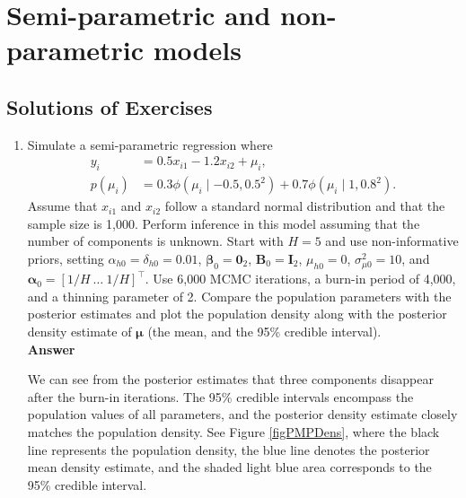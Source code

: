 \chapter{Semi-parametric and non-parametric models}\label{chap11}

\section*{Solutions of Exercises}\label{sec11_1}
\begin{enumerate}[leftmargin=*]

\item Simulate a semi-parametric regression where  
\begin{align*}
	y_i &= 0.5x_{i1} - 1.2x_{i2} + \mu_i, \\
	p(\mu_i) &= 
	0.3 \phi(\mu_i \mid -0.5,0.5^2) + 0.7 \phi(\mu_i \mid 1,0.8^2).		
\end{align*}
Assume that $x_{i1}$ and $x_{i2}$ follow a standard normal distribution and that the sample size is 1,000. Perform inference in this model assuming that the number of components is unknown. Start with $H=5$ and use non-informative priors, setting $\alpha_{h0}=\delta_{h0}=0.01$, $\bm{\beta}_0=\bm{0}_2$, $\bm{B}_0=\bm{I}_2$, $\mu_{h0}=0$, $\sigma^2_{\mu 0}=10$, and $\bm{\alpha}_0=[1/H \ \dots \ 1/H]^{\top}$. Use 6,000 MCMC iterations, a burn-in period of 4,000, and a thinning parameter of 2. Compare the population parameters with the posterior estimates and plot the population density along with the posterior density estimate of $\bm{\mu}$ (the mean, and the 95\% credible interval).\\

\textbf{Answer}

We can see from the posterior estimates that three components disappear after the burn-in iterations. The 95\% credible intervals encompass the population values of all parameters, and the posterior density estimate closely matches the population density. See Figure \ref{figPMPDens}, where the black line represents the population density, the blue line denotes the posterior mean density estimate, and the shaded light blue area corresponds to the 95\% credible interval.
 

\end{enumerate}
